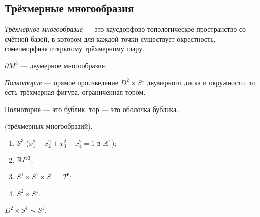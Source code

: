 \subsection{Трёхмерные многообразия}
\begin{definition}
    \textit{Трёхмерное многообразие} — это хаусдорфово топологическое пространство со счётной базой, в котором для каждой точки существует окрестность, гомеоморфная открытому трёхмерному шару.
\end{definition} 

\begin{remark}
    $\partial M^3$ — двумерное многообразие.
\end{remark}

\begin{definition}
    \textit{Полноторие} — прямое произведение $D^2 \times S^1$ двумерного диска и окружности, то есть трёхмерная фигура, ограниченная тором.
\end{definition} 

\begin{remark}
    Полноторие — это бублик, тор — это оболочка бублика.
\end{remark}

\begin{example}(трёхмерных многообразий).
    \begin{enumerate}
        \item $S^3$ ($x_1^2 + x_2^2 + x_3^2 + x_4^2 = 1$ в $\mathbb{R}^4$);
        \item $\mathbb{R} P^3$;
        \item $S^1 \times S^1 \times S^1 = T^3$;
        \item $S^2 \times S^1$.
    \end{enumerate}
\end{example}

\begin{statement}
    $D^2 \times S^1 \sim S^1$.
\end{statement} 
